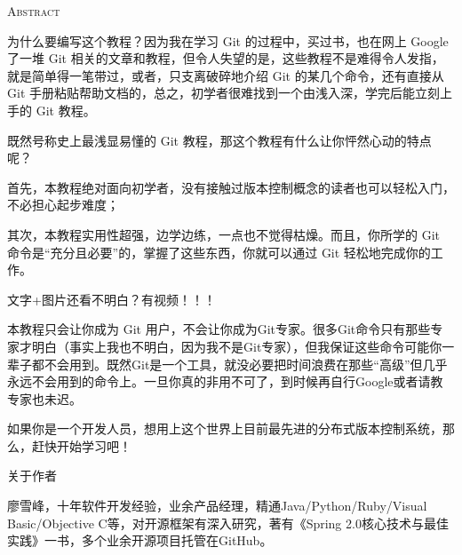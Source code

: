 \begin{center}
  \textsc{Abstract}
\end{center}
%
\noindent
%
为什么要编写这个教程？因为我在学习 Git 的过程中，买过书，也在网上 Google 了一堆 Git 相关的文章和教程，但令人失望的是，这些教程不是难得令人发指，就是简单得一笔带过，或者，只支离破碎地介绍 Git 的某几个命令，还有直接从 Git 手册粘贴帮助文档的，总之，初学者很难找到一个由浅入深，学完后能立刻上手的 Git 教程。

既然号称史上最浅显易懂的 Git 教程，那这个教程有什么让你怦然心动的特点呢？

首先，本教程绝对面向初学者，没有接触过版本控制概念的读者也可以轻松入门，不必担心起步难度；

其次，本教程实用性超强，边学边练，一点也不觉得枯燥。而且，你所学的 Git 命令是“充分且必要”的，掌握了这些东西，你就可以通过 Git 轻松地完成你的工作。

文字+图片还看不明白？有视频！！！

本教程只会让你成为 Git 用户，不会让你成为Git专家。很多Git命令只有那些专家才明白（事实上我也不明白，因为我不是Git专家），但我保证这些命令可能你一辈子都不会用到。既然Git是一个工具，就没必要把时间浪费在那些“高级”但几乎永远不会用到的命令上。一旦你真的非用不可了，到时候再自行Google或者请教专家也未迟。

如果你是一个开发人员，想用上这个世界上目前最先进的分布式版本控制系统，那么，赶快开始学习吧！

关于作者

廖雪峰，十年软件开发经验，业余产品经理，精通Java/Python/Ruby/Visual Basic/Objective C等，对开源框架有深入研究，著有《Spring 2.0核心技术与最佳实践》一书，多个业余开源项目托管在GitHub。